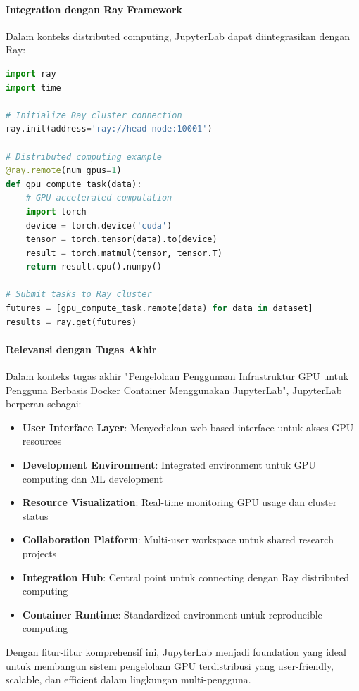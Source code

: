 \paragraph{Integration dengan Ray Framework}

Dalam konteks distributed computing, JupyterLab dapat diintegrasikan dengan Ray:

\begin{lstlisting}[language=Python]
import ray
import time

# Initialize Ray cluster connection
ray.init(address='ray://head-node:10001')

# Distributed computing example
@ray.remote(num_gpus=1)
def gpu_compute_task(data):
    # GPU-accelerated computation
    import torch
    device = torch.device('cuda')
    tensor = torch.tensor(data).to(device)
    result = torch.matmul(tensor, tensor.T)
    return result.cpu().numpy()

# Submit tasks to Ray cluster
futures = [gpu_compute_task.remote(data) for data in dataset]
results = ray.get(futures)
\end{lstlisting}

\paragraph{Relevansi dengan Tugas Akhir}

Dalam konteks tugas akhir "Pengelolaan Penggunaan Infrastruktur GPU untuk Pengguna Berbasis Docker Container Menggunakan JupyterLab", JupyterLab berperan sebagai:

\begin{itemize}
\item \textbf{User Interface Layer}: Menyediakan web-based interface untuk akses GPU resources
\item \textbf{Development Environment}: Integrated environment untuk GPU computing dan ML development
\item \textbf{Resource Visualization}: Real-time monitoring GPU usage dan cluster status
\item \textbf{Collaboration Platform}: Multi-user workspace untuk shared research projects
\item \textbf{Integration Hub}: Central point untuk connecting dengan Ray distributed computing
\item \textbf{Container Runtime}: Standardized environment untuk reproducible computing
\end{itemize}

Dengan fitur-fitur komprehensif ini, JupyterLab menjadi foundation yang ideal untuk membangun sistem pengelolaan GPU terdistribusi yang user-friendly, scalable, dan efficient dalam lingkungan multi-pengguna.


